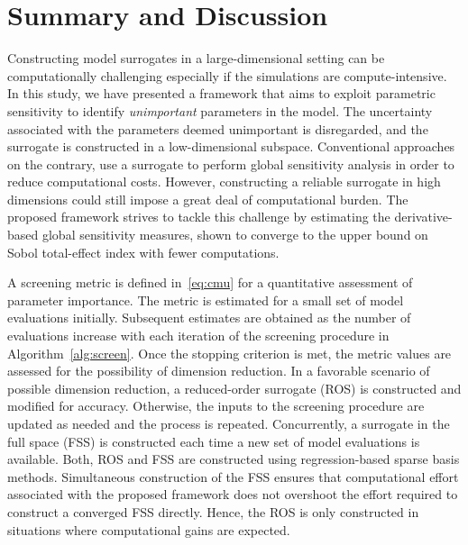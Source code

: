 \section{Summary and Discussion}
\label{sec:disc}


Constructing model surrogates in a large-dimensional setting can be computationally
challenging especially if the simulations are compute-intensive. In this study, we
have presented a framework that aims to exploit parametric sensitivity to identify
\textit{unimportant} parameters in the model. The uncertainty associated with the
parameters deemed unimportant is disregarded, and the surrogate is constructed in a
low-dimensional subspace. Conventional approaches on the contrary, use a surrogate
to perform global sensitivity analysis in order to reduce computational costs. However, 
constructing a reliable surrogate in high dimensions could still impose a great
deal of computational burden. The proposed framework strives to tackle this challenge by
estimating the derivative-based global sensitivity measures, shown to converge to the
upper bound on Sobol total-effect index with fewer computations.

A screening metric is defined in~\eqref{eq:cmu} for a quantitative assessment of 
parameter importance. The metric is estimated for a small set of model evaluations
initially. Subsequent estimates are obtained as the number of evaluations increase
with each iteration of the screening procedure in Algorithm~\ref{alg:screen}. 
Once the stopping criterion is met, the metric values are assessed for the
possibility of dimension reduction. In a favorable scenario of possible dimension
reduction, a reduced-order surrogate (ROS) is constructed and modified for accuracy. 
Otherwise, the inputs to the screening procedure are updated as needed and the
process is repeated. Concurrently, a surrogate in the full space (FSS) is constructed
each time a new set of model evaluations is available. Both, ROS and FSS are
constructed using regression-based sparse basis methods. Simultaneous construction
of the FSS ensures that computational effort associated with the proposed framework
does not overshoot the effort required to construct a converged FSS directly.
Hence, the ROS is only constructed in situations where computational gains are
expected. 

